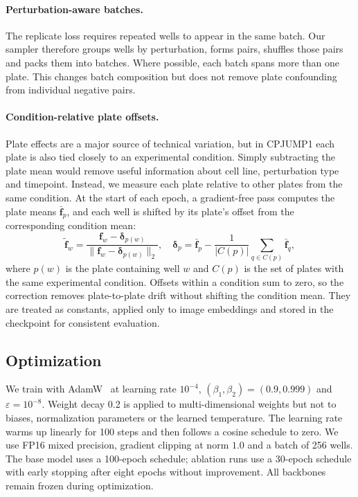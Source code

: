 \paragraph{Perturbation-aware batches.}
The replicate loss requires repeated wells to appear in the same batch. Our sampler therefore
groups wells by perturbation, forms pairs, shuffles those pairs and packs them into batches. Where
possible, each batch spans more than one plate. This changes batch composition but does not remove
plate confounding from individual negative pairs.

\paragraph{Condition-relative plate offsets.}
Plate effects are a major source of technical variation, but in CPJUMP1 each plate is also tied
closely to an experimental condition. Simply subtracting the plate mean would remove useful
information about cell line, perturbation type and timepoint. Instead, we measure each plate
relative to other plates from the same condition. At the start of each epoch, a gradient-free pass
computes the plate means $\bar{\mathbf{f}}_p$, and each well is shifted by its plate's offset from
the corresponding condition mean:
\begin{equation}
  \tilde{\mathbf{f}}_w
  = \frac{
    \mathbf{f}_w - \boldsymbol{\delta}_{p(w)}
  }{
    \|\mathbf{f}_w - \boldsymbol{\delta}_{p(w)}\|_2
  },
  \quad
  \boldsymbol{\delta}_p
  = \bar{\mathbf{f}}_p
  - \frac{1}{|C(p)|}
  \sum_{q \in C(p)} \bar{\mathbf{f}}_q ,
\end{equation}
where $p(w)$ is the plate containing well $w$ and $C(p)$ is the set of plates with the same
experimental condition. Offsets within a condition sum to zero, so the correction removes
plate-to-plate drift without shifting the condition mean. They are treated as constants, applied
only to image embeddings and stored in the checkpoint for consistent evaluation.

\subsection{Optimization}

We train with AdamW~\cite{loshchilov2019adamw} at learning rate $10^{-4}$,
$(\beta_1, \beta_2) = (0.9, 0.999)$ and $\varepsilon = 10^{-8}$. Weight decay 0.2 is applied to
multi-dimensional weights but not to biases, normalization parameters or the learned temperature.
The learning rate warms up
linearly for 100 steps and then follows a cosine schedule to zero. We use FP16 mixed precision,
gradient clipping at norm $1.0$ and a batch of 256 wells. The base model uses a 100-epoch schedule;
ablation runs use a 30-epoch schedule with early stopping after eight epochs without improvement.
All backbones remain frozen during optimization.
